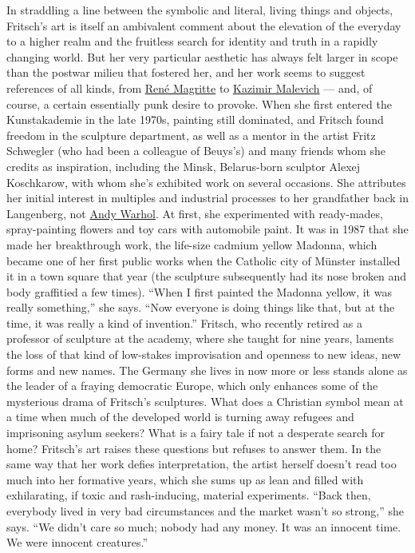 In straddling a line between the symbolic and literal, living things and
objects, Fritsch's art is itself an ambivalent comment about the
elevation of the everyday to a higher realm and the fruitless search for
identity and truth in a rapidly changing world. But her very particular
aesthetic has always felt larger in scope than the postwar milieu that
fostered her, and her work seems to suggest references of all kinds,
from
\href{https://www.nytimes3xbfgragh.onion/topic/person/rene-magritte}{René
Magritte} to
\href{https://www.nytimes3xbfgragh.onion/2016/05/26/arts/international/celebrating-kazimir-malevich-a-pioneer-in-abstract-art.html}{Kazimir
Malevich} --- and, of course, a certain essentially punk desire to
provoke. When she first entered the Kunstakademie in the late 1970s,
painting still dominated, and Fritsch found freedom in the sculpture
department, as well as a mentor in the artist Fritz Schwegler (who had
been a colleague of Beuys's) and many friends whom she credits as
inspiration, including the Minsk, Belarus-born sculptor Alexej
Koschkarow, with whom she's exhibited work on several occasions. She
attributes her initial interest in multiples and industrial processes to
her grandfather back in Langenberg, not
\href{https://www.nytimes3xbfgragh.onion/2018/05/02/t-magazine/andy-warhol-photo-portraits.html}{Andy
Warhol}. At first, she experimented with ready-mades, spray-painting
flowers and toy cars with automobile paint. It was in 1987 that she made
her breakthrough work, the life-size cadmium yellow Madonna, which
became one of her first public works when the Catholic city of Münster
installed it in a town square that year (the sculpture subsequently had
its nose broken and body graffitied a few times). ``When I first painted
the Madonna yellow, it was really something,'' she says. ``Now everyone
is doing things like that, but at the time, it was really a kind of
invention.'' Fritsch, who recently retired as a professor of sculpture
at the academy, where she taught for nine years, laments the loss of
that kind of low-stakes improvisation and openness to new ideas, new
forms and new names. The Germany she lives in now more or less stands
alone as the leader of a fraying democratic Europe, which only enhances
some of the mysterious drama of Fritsch's sculptures. What does a
Christian symbol mean at a time when much of the developed world is
turning away refugees and imprisoning asylum seekers? What is a fairy
tale if not a desperate search for home? Fritsch's art raises these
questions but refuses to answer them. In the same way that her work
defies interpretation, the artist herself doesn't read too much into her
formative years, which she sums up as lean and filled with exhilarating,
if toxic and rash-inducing, material experiments. ``Back then, everybody
lived in very bad circumstances and the market wasn't so strong,'' she
says. ``We didn't care so much; nobody had any money. It was an innocent
time. We were innocent creatures.''

